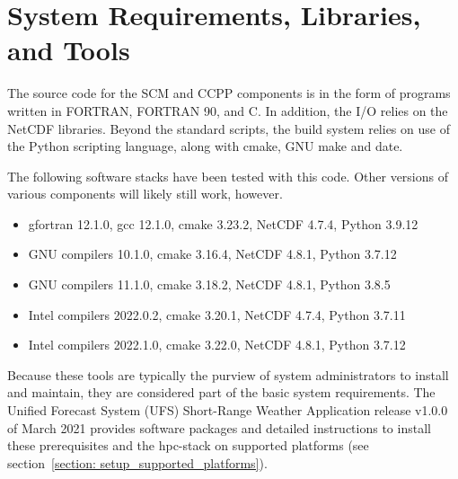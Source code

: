 \section{System Requirements, Libraries, and Tools}
\label{section: systemrequirements}

The source code for the SCM and CCPP components is in the form of programs written in FORTRAN, FORTRAN 90, and C. In addition, the I/O relies on the NetCDF libraries. Beyond the standard scripts, the build system relies on use of the Python scripting language, along with cmake, GNU make and date.

The following software stacks have been tested with this code. Other versions of various components will likely still work, however.

\begin{itemize}
	\item gfortran 12.1.0, gcc 12.1.0, cmake 3.23.2, NetCDF 4.7.4, Python 3.9.12
	\item GNU compilers 10.1.0, cmake 3.16.4, NetCDF 4.8.1, Python 3.7.12
	\item GNU compilers 11.1.0, cmake 3.18.2, NetCDF 4.8.1, Python 3.8.5
	\item Intel compilers 2022.0.2, cmake 3.20.1, NetCDF 4.7.4, Python 3.7.11
	\item Intel compilers 2022.1.0, cmake 3.22.0, NetCDF 4.8.1, Python 3.7.12	
\end{itemize}
	
Because these tools are typically the purview of system administrators to install and maintain, they are considered  part of the basic system requirements. The Unified Forecast System (UFS) Short-Range Weather Application release v1.0.0 of March 2021 provides software packages and detailed instructions to install these prerequisites and the hpc-stack on supported platforms (see section~\ref{section: setup_supported_platforms}).

